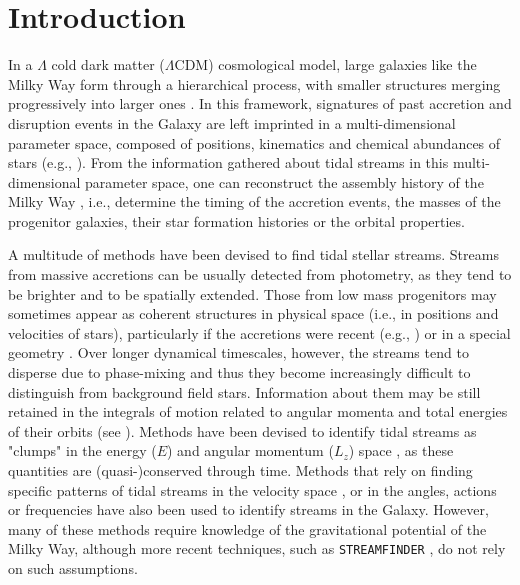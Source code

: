 \section{Introduction}
\label{sec:intro_ch2}

In a $\Lambda$ cold dark matter ($\Lambda$CDM) cosmological model, large galaxies like the Milky Way form through a hierarchical process, with smaller structures merging progressively into larger ones \citep{White1978,Searle1978}. In this framework, signatures of past accretion and disruption events in the Galaxy are left imprinted in a multi-dimensional parameter space, composed of positions, kinematics and chemical abundances of stars (e.g., \citealt{Helmi2020}). From the information gathered about tidal streams in this multi-dimensional parameter space, one can reconstruct the assembly history of the Milky Way \citep{Freeman2002}, i.e., determine the timing of the accretion events, the masses of the progenitor galaxies, their star formation histories or the orbital properties.

A multitude of methods have been devised to find tidal stellar streams. Streams from massive accretions can be usually detected from photometry, as they tend to be brighter and to be spatially extended. Those from low mass progenitors may sometimes appear as coherent structures in physical space (i.e., in positions and velocities of stars), particularly if the accretions were recent (e.g., \citealt{Bullock2005,Johnston2008}) or in a special geometry \citep{Johnston1996}. Over longer dynamical timescales, however, the streams tend to disperse due to phase-mixing \citep{Tremaine1999} and thus they become increasingly difficult to distinguish from background field stars. Information about them may be still retained in the integrals of motion related to angular momenta and total energies of their orbits (see \citealt{Binney2008}). Methods have been devised to identify tidal streams as "clumps" in the energy ($E$) and angular momentum ($L_z$) space \citep{Helmi1999a,Gomez2010}, as these quantities are (quasi-)conserved through time. Methods that rely on finding specific patterns of tidal streams in the velocity space \citep{Johnston2002,Gomez2010,Koppelman2021}, or in the angles, actions or frequencies  \citep{Bovy2014,McMillan2008,Sanders2016,Malhan2022} have also been used to identify streams in the Galaxy. However, many of these methods require knowledge  of the gravitational potential of the Milky Way, although more recent techniques, such as \texttt{STREAMFINDER} \citep{Malhan2018}, do not rely on such assumptions.

